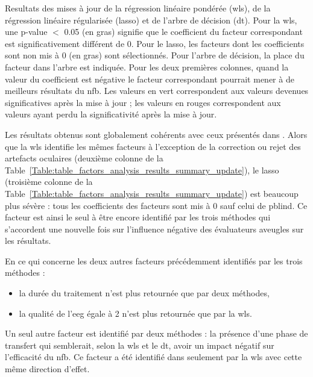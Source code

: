 \begin{table}[h!]
  \centering
  \caption{Resultats des mises à jour de la régression linéaire pondérée (\gls{wls}), de la régression linéaire régularisée (\gls{lasso}) et de l'arbre de décision (\gls{dt}). Pour la \gls{wls}, une p-value $<$ 0.05 
	(en gras) signifie que le coefficient du facteur correspondant est significativement différent de 0. Pour le \gls{lasso}, les facteurs dont les coefficients sont non mis à 0 (en gras) sont 
	sélectionnés. Pour l'arbre de décision, la place du facteur dans l'arbre est indiquée. Pour les deux premières colonnes, quand la valeur du coefficient est négative le facteur 
	correspondant pourrait mener à de meilleurs résultats du \gls{nfb}. Les valeurs en vert correspondent aux valeurs devenues significatives après la mise à jour ; les valeurs
	en rouges correspondent aux valeurs ayant perdu la significativité après la mise à jour.}
  
  \label{Table:table_factors_analysis_results_summary_update}
\end{table}

Les résultats obtenus sont globalement cohérents avec ceux présentés dans \citet{Bussalb2019a}. Alors que la \gls{wls} identifie les mêmes facteurs à l'exception de la correction ou rejet 
des artefacts oculaires (deuxième colonne de la Table~\ref{Table:table_factors_analysis_results_summary_update}), le \gls{lasso} (troisième colonne de la 
Table~\ref{Table:table_factors_analysis_results_summary_update}) est beaucoup plus sévère : tous les coefficients des facteurs sont mis à 0 sauf celui de \gls{pblind}. Ce facteur est ainsi 
le seul à être encore identifié par les trois méthodes qui s'accordent une nouvelle fois sur l'influence négative des évaluateurs aveugles sur les résultats.  

En ce qui concerne les deux autres facteurs précédemment identifiés par les trois méthodes : 
\begin{itemize}
\item la durée du traitement n'est plus retournée que par deux méthodes, 
\item la qualité de l'\gls{eeg} égale à 2 n'est plus retournée que par la \gls{wls}. 
\end{itemize}

Un seul autre facteur est identifié par deux méthodes : la présence d'une phase de transfert qui semblerait, selon la \gls{wls} et le \gls{dt}, avoir un impact négatif sur l'efficacité 
du \gls{nfb}. Ce facteur a été identifié dans \citet{Bussalb2019a} seulement par la \gls{wls} avec cette même direction d'effet.

